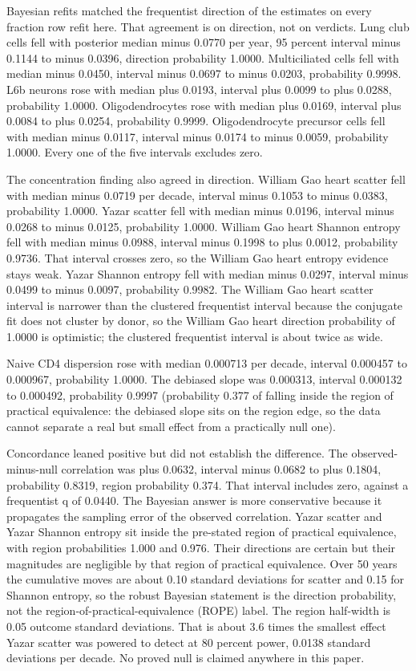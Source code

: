 \documentclass[11pt]{article}
\begin{document}
Bayesian refits matched the frequentist direction of the estimates on every fraction row refit here. That agreement is on direction, not on verdicts. Lung club cells fell with posterior median minus 0.0770 per year, 95 percent interval minus 0.1144 to minus 0.0396, direction probability 1.0000. Multiciliated cells fell with median minus 0.0450, interval minus 0.0697 to minus 0.0203, probability 0.9998. L6b neurons rose with median plus 0.0193, interval plus 0.0099 to plus 0.0288, probability 1.0000. Oligodendrocytes rose with median plus 0.0169, interval plus 0.0084 to plus 0.0254, probability 0.9999. Oligodendrocyte precursor cells fell with median minus 0.0117, interval minus 0.0174 to minus 0.0059, probability 1.0000. Every one of the five intervals excludes zero.

The concentration finding also agreed in direction. William Gao heart scatter fell with median minus 0.0719 per decade, interval minus 0.1053 to minus 0.0383, probability 1.0000. Yazar scatter fell with median minus 0.0196, interval minus 0.0268 to minus 0.0125, probability 1.0000. William Gao heart Shannon entropy fell with median minus 0.0988, interval minus 0.1998 to plus 0.0012, probability 0.9736. That interval crosses zero, so the William Gao heart entropy evidence stays weak. Yazar Shannon entropy fell with median minus 0.0297, interval minus 0.0499 to minus 0.0097, probability 0.9982. The William Gao heart scatter interval is narrower than the clustered frequentist interval because the conjugate fit does not cluster by donor, so the William Gao heart direction probability of 1.0000 is optimistic; the clustered frequentist interval is about twice as wide.

Naive CD4 dispersion rose with median 0.000713 per decade, interval 0.000457 to 0.000967, probability 1.0000. The debiased slope was 0.000313, interval 0.000132 to 0.000492, probability 0.9997 (probability 0.377 of falling inside the region of practical equivalence: the debiased slope sits on the region edge, so the data cannot separate a real but small effect from a practically null one).

Concordance leaned positive but did not establish the difference. The observed-minus-null correlation was plus 0.0632, interval minus 0.0682 to plus 0.1804, probability 0.8319, region probability 0.374. That interval includes zero, against a frequentist q of 0.0440. The Bayesian answer is more conservative because it propagates the sampling error of the observed correlation. Yazar scatter and Yazar Shannon entropy sit inside the pre-stated region of practical equivalence, with region probabilities 1.000 and 0.976. Their directions are certain but their magnitudes are negligible by that region of practical equivalence. Over 50 years the cumulative moves are about 0.10 standard deviations for scatter and 0.15 for Shannon entropy, so the robust Bayesian statement is the direction probability, not the region-of-practical-equivalence (ROPE) label. The region half-width is 0.05 outcome standard deviations. That is about 3.6 times the smallest effect Yazar scatter was powered to detect at 80 percent power, 0.0138 standard deviations per decade. No proved null is claimed anywhere in this paper.
\end{document}

